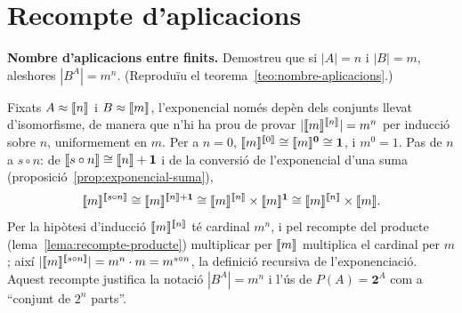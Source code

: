 \section{Recompte d'aplicacions}\label{prac:recompte-aplicacions}

\begin{exercici}
\textbf{Nombre d'aplicacions entre finits.} Demostreu que si \(|A|=n\) i \(|B|=m\), aleshores \(|B^{A}|=m^{n}\). (Reproduïu el teorema~\ref{teo:nombre-aplicacions}.)
\end{exercici}
\begin{solucio}
Fixats \(A\approx\llbracket n\rrbracket\) i \(B\approx\llbracket m\rrbracket\), l'exponencial només depèn dels conjunts llevat d'isomorfisme, de manera que n'hi ha prou de provar \(|\llbracket m\rrbracket^{\llbracket n\rrbracket}|=m^{n}\) per inducció sobre \(n\), uniformement en \(m\). Per a \(n=0\), \(\llbracket m\rrbracket^{\llbracket 0\rrbracket}\cong\llbracket m\rrbracket^{\mathbf0}\cong\mathbf1\), i \(m^{0}=1\). Pas de \(n\) a \(s\circ n\): de \(\llbracket s\circ n\rrbracket\cong\llbracket n\rrbracket+\mathbf1\) i de la conversió de l'exponencial d'una suma (proposició~\ref{prop:exponencial-suma}),
\[
\llbracket m\rrbracket^{\llbracket s\circ n\rrbracket}\cong\llbracket m\rrbracket^{\llbracket n\rrbracket+\mathbf1}\cong\llbracket m\rrbracket^{\llbracket n\rrbracket}\times\llbracket m\rrbracket^{\mathbf1}\cong\llbracket m\rrbracket^{\llbracket n\rrbracket}\times\llbracket m\rrbracket.
\]
Per la hipòtesi d'inducció \(\llbracket m\rrbracket^{\llbracket n\rrbracket}\) té cardinal \(m^{n}\), i pel recompte del producte (lema~\ref{lema:recompte-producte}) multiplicar per \(\llbracket m\rrbracket\) multiplica el cardinal per \(m\); així \(|\llbracket m\rrbracket^{\llbracket s\circ n\rrbracket}|=m^{n}\cdot m=m^{s\circ n}\), la definició recursiva de l'exponenciació. Aquest recompte justifica la notació \(|B^{A}|=m^{n}\) i l'ús de \(P(A)=\mathbf2^{A}\) com a \enquote{conjunt de \(2^{n}\) parts}.
\end{solucio}
